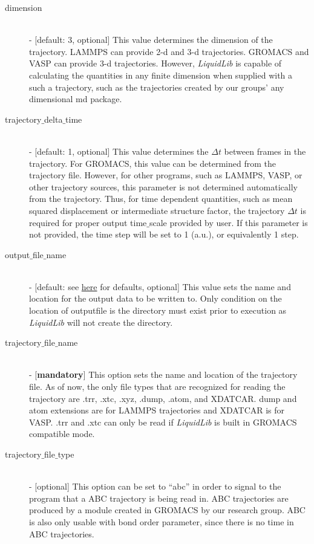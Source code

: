 \documentclass{article}
\begin{document}
\begin{description}
	\item[dimension] \hfill \\
	- [default: 3, optional] This value determines the dimension of the trajectory.  LAMMPS can provide 2-d and 3-d trajectories.  GROMACS and VASP can provide 3-d trajectories.  However, \textit{LiquidLib} is capable of calculating the quantities in any finite dimension when supplied with a such a trajectory, such as the trajectories created by our groups' any dimensional md package. 
	
	\item[trajectory$\_$delta$\_$time] \hfill \\
	- [default: 1, optional] This value determines the $\Delta t$ between frames in the trajectory.  For GROMACS, this value can be determined from the trajectory file.  However, for other programs, such as LAMMPS, VASP, or other trajectory sources, this parameter is not determined automatically from the trajectory.  Thus, for time dependent quantities, such as mean squared displacement or intermediate structure factor, the trajectory $\Delta t$ is required for proper output time$\_$scale provided by user.  If this parameter is not provided, the time step will be set to 1 (a.u.), or equivalently 1 step. 
	
	\item[output$\_$file$\_$name] \hfill \\
	- [default: see \hyperref[input_output]{here} for defaults, optional] This value sets the name and location for the output data to be written to.  Only condition on the location of outputfile is the directory must exist prior to execution as \textit{LiquidLib} will not create the directory.
	
	\item[trajectory$\_$file$\_$name] \hfill \\
	- [\textbf{mandatory}] This option sets the name and location of the trajectory file.  As of now, the only file types that are recognized for reading the trajectory are .trr, .xtc, .xyz, .dump, .atom, and XDATCAR.  dump and atom extensions are for LAMMPS trajectories and XDATCAR is for VASP.  .trr and .xtc can only be read if \textit{LiquidLib} is built in GROMACS compatible mode.
	
	\item[trajectory$\_$file$\_$type] \hfill \\
	- [optional] This option can be set to ``abc'' in order to signal to the program that a ABC trajectory is being read in.  ABC trajectories are produced by a module created in GROMACS by our research group.  ABC is also only usable with bond order parameter, since there is no time in ABC trajectories.
	

\end{description}
\end{document}
